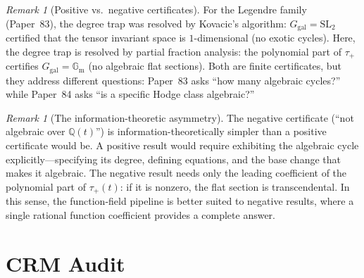 \documentclass[11pt]{article}
\theoremstyle{plain}
\theoremstyle{definition}
\theoremstyle{remark}
\newtheorem{remark}[theorem]{Remark}
\newcommand{\Q}{\mathbb{Q}}
\newcommand{\SL}{\mathrm{SL}}
\newcommand{\Ggal}{G_{\mathrm{gal}}}
\newcommand{\Gm}{\mathbb{G}_{\mathrm{m}}}
\begin{document}
\begin{remark}[Positive vs.\ negative certificates]
For the Legendre family (Paper~83), the degree trap was resolved by
Kovacic's algorithm: $\Ggal = \SL_2$ certified that the tensor invariant
space is $1$-dimensional (no exotic cycles). Here, the degree trap is
resolved by partial fraction analysis: the polynomial part of $\tau_+$
certifies $\Ggal = \Gm$ (no algebraic flat sections). Both are finite
certificates, but they address different questions: Paper~83 asks ``how
many algebraic cycles?'' while Paper~84 asks ``is a specific Hodge
class algebraic?''
\end{remark}

\begin{remark}[The information-theoretic asymmetry]
The negative certificate (``not algebraic over $\Q(t)$'') is
information-theoretically simpler than a positive certificate would be.
A positive result would require exhibiting the algebraic cycle
explicitly---specifying its degree, defining equations, and the base
change that makes it algebraic. The negative result needs only the
leading coefficient of the polynomial part of $\tau_+(t)$: if it is
nonzero, the flat section is transcendental. In this sense, the
function-field pipeline is better suited to negative results, where a
single rational function coefficient provides a complete answer.
\end{remark}

\section{CRM Audit}
\end{document}
